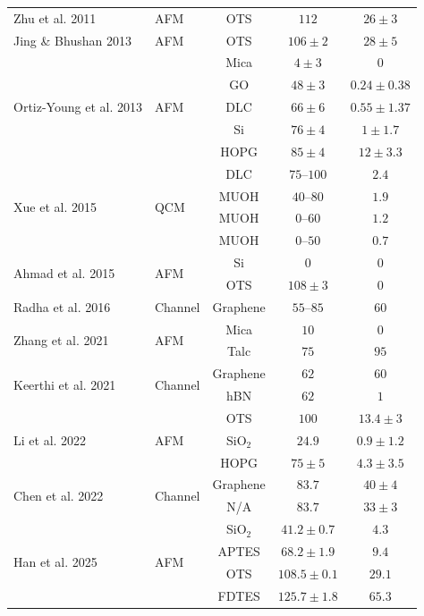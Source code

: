 \documentclass{article}
\begin{document}
\begin{center}
\begin{table}
{\begin{tabular}{llccc}
Zhu et al. 2011 & AFM & OTS & $112$ & $26 \pm 3$ \\
\cline{1-5}

Jing \& Bhushan 2013 & AFM & OTS & $106 \pm 2$ & $28 \pm 5$ \\
\cline{1-5}

\multirow{5}{*}{Ortiz-Young et al. 2013} & \multirow{5}{*}{AFM} & Mica & $4 \pm 3$ & $0$ \\
 &  & GO & $48 \pm 3$ & $0.24 \pm 0.38$ \\
 &  & DLC & $66 \pm 6$ & $0.55 \pm 1.37$ \\
 &  & Si & $76 \pm 4$ & $1 \pm 1.7$ \\
 &  & HOPG & $85 \pm 4$ & $12 \pm 3.3$ \\
\cline{1-5}

\multirow{4}{*}{Xue et al. 2015} & \multirow{4}{*}{QCM} & DLC & $75$--$100$ & $2.4$ \\
 &  & MUOH & $40$--$80$ & $1.9$ \\
 &  & MUOH & $0$--$60$ & $1.2$ \\
 &  & MUOH & $0$--$50$ & $0.7$ \\
\cline{1-5}

\multirow{2}{*}{Ahmad et al. 2015} & \multirow{2}{*}{AFM} & Si & $0$ & $0$ \\
 &  & OTS & $108 \pm 3$ & $0$ \\
\cline{1-5}

Radha et al. 2016 & Channel & Graphene & $55$--$85$ & $60$ \\
\cline{1-5}

\multirow{2}{*}{Zhang et al. 2021} & \multirow{2}{*}{AFM} & Mica & $10$ & $0$ \\
 &  & Talc & $75$ & $95$ \\
\cline{1-5}

\multirow{2}{*}{Keerthi et al. 2021} & \multirow{2}{*}{Channel} & Graphene & $62$ & $60$ \\
 &  & hBN & $62$ & $1$ \\
\cline{1-5}

\multirow{3}{*}{Li et al. 2022} & \multirow{3}{*}{AFM} & OTS & $100$ & $13.4 \pm 3$ \\
 &  & SiO$_2$ & $24.9$ & $0.9 \pm 1.2$ \\
 &  & HOPG & $75 \pm 5$ & $4.3 \pm 3.5$ \\
\cline{1-5}

\multirow{2}{*}{Chen et al. 2022} & \multirow{2}{*}{Channel} & Graphene & $83.7$ & $40 \pm 4$ \\
 &  & N/A & $83.7$ & $33 \pm 3$ \\
\cline{1-5}

\multirow{4}{*}{Han et al. 2025} & \multirow{4}{*}{AFM} & SiO$_2$ & $41.2 \pm 0.7$ & $4.3$ \\
 &  & APTES & $68.2 \pm 1.9$ & $9.4$ \\
 &  & OTS & $108.5 \pm 0.1$ & $29.1$ \\
 &  & FDTES & $125.7 \pm 1.8$ & $65.3$ \\
\cline{1-5}

\hline
\end{tabular}
}%
\end{table}
\end{center}
\end{document}
